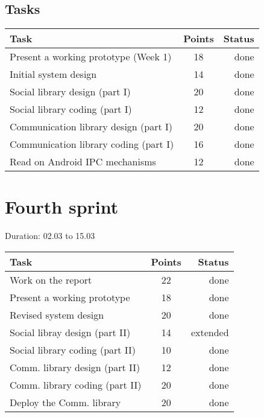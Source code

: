 \subsection{Tasks}


\begin{table}
\begin{tabular}{ | l | c | r | }

\hline
\textbf{Task} & \textbf{Points} & \textbf{Status} \\
\hline

Present a working prototype (Week 1)		& 18 & done \\
\hline
Initial system design						& 14 & done \\
\hline
Social library design (part I)				& 20 & done \\
\hline
Social library coding (part I)				& 12 & done \\
\hline
Communication library design (part I)		& 20 & done \\
\hline
Communication library coding (part I) 		& 16 & done \\
\hline
Read on Android IPC mechanisms				& 12 & done \\
\hline


\end{tabular}
\end{table}


\section{Fourth sprint}

Duration: 02.03 to 15.03

\begin{table}
\begin{tabular}{ | l | c | r | }

\hline
\textbf{Task} & \textbf{Points} & \textbf{Status} \\
\hline

Work on the report				& 22 & done \\ 
\hline
Present a working prototype		& 18 & done \\
\hline
Revised system design			& 20 & done \\
\hline
Social libray design (part II)	& 14 & extended \\
\hline
Social library coding (part II)	& 10 & done \\
\hline
Comm. library design (part II)	& 12 & done \\
\hline
Comm. library coding (part II)	& 20 & done \\
\hline
Deploy the Comm. library		& 20 & done \\

\end{tabular}
\end{table}

